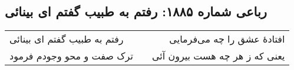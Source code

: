\begin{center}
\section*{رباعی شماره ۱۸۸۵: رفتم به طبیب گفتم ای بینائی}
\label{sec:1885}
\begin{longtable}{l p{0.5cm} r}
رفتم به طبیب گفتم ای بینائی
&&
افتادهٔ عشق را چه می‌فرمایی
\\
ترک صفت و محو وجودم فرمود
&&
یعنی که ز هر چه هست بیرون آئی
\\
\end{longtable}
\end{center}
